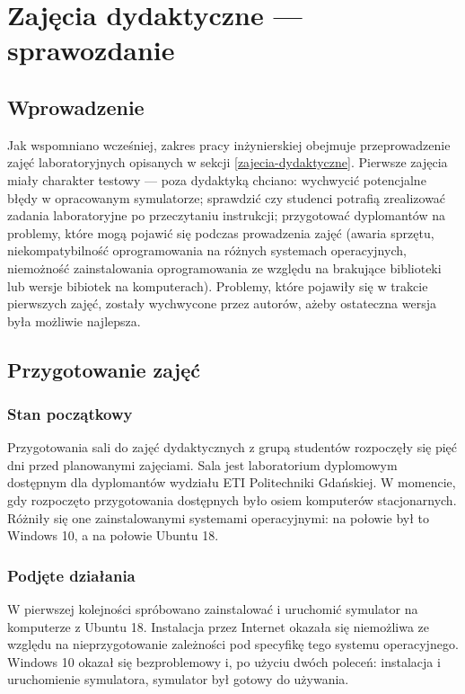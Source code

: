 \section{Zajęcia dydaktyczne --- sprawozdanie}
\subsection{Wprowadzenie}

Jak wspomniano wcześniej, zakres pracy inżynierskiej obejmuje przeprowadzenie zajęć laboratoryjnych opisanych w sekcji \ref{zajecia-dydaktyczne}.
Pierwsze zajęcia miały charakter testowy --- poza dydaktyką chciano: wychwycić potencjalne błędy w opracowanym symulatorze; sprawdzić czy studenci
potrafią zrealizować zadania laboratoryjne po przeczytaniu instrukcji; przygotować dyplomantów na problemy, które mogą pojawić się podczas prowadzenia
zajęć (awaria sprzętu, niekompatybilność oprogramowania na różnych systemach operacyjnych, niemożność zainstalowania oprogramowania ze względu na brakujące
biblioteki lub wersje bibiotek na komputerach). Problemy, które pojawiły się w trakcie pierwszych zajęć, zostały wychwycone przez autorów, ażeby
ostateczna wersja była możliwie najlepsza.

\subsection{Przygotowanie zajęć}
\subsubsection{Stan początkowy}
Przygotowania sali do zajęć dydaktycznych z grupą studentów rozpoczęły się pięć dni przed planowanymi zajęciami. Sala jest laboratorium dyplomowym dostępnym dla dyplomantów wydziału ETI Politechniki Gdańskiej. W momencie, gdy rozpoczęto przygotowania dostępnych było osiem komputerów stacjonarnych. Różniły się one zainstalowanymi systemami operacyjnymi: na połowie był to Windows 10, a na połowie Ubuntu 18.

\subsubsection{Podjęte działania}
W pierwszej kolejności spróbowano zainstalować i uruchomić symulator na komputerze z Ubuntu 18. Instalacja przez Internet okazała się niemożliwa ze względu na nieprzygotowanie zależności pod specyfikę tego systemu operacyjnego. Windows 10 okazał się bezproblemowy i, po użyciu dwóch poleceń: instalacja i uruchomienie symulatora, symulator był gotowy do używania.

